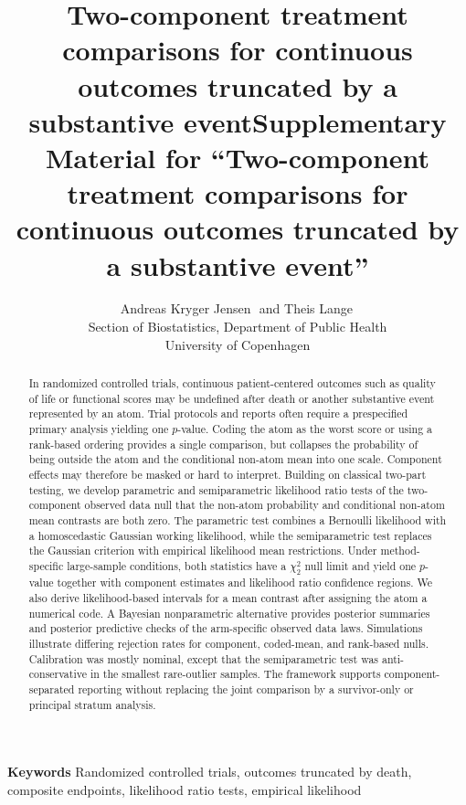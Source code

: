 \documentclass[11pt]{article}
\title{Two-component treatment comparisons for continuous outcomes truncated by a substantive event}
\title{Supplementary Material for ``Two-component treatment comparisons for continuous outcomes truncated by a substantive event''}
\author{
  Andreas Kryger Jensen\,\orcidlink{0000-0002-8233-9176}\, and Theis Lange\,\orcidlink{0000-0001-6807-8347}\\
  Section of Biostatistics, Department of Public Health\\
  University of Copenhagen
}
\date{}
\begin{document}
\maketitle
\begingroup
\renewcommand{\thefootnote}{}
\endgroup

\ifManuscriptIncludeMainText
\begin{abstract}
In randomized controlled trials, continuous patient-centered outcomes such as quality of life or functional scores may be undefined after death or another substantive event represented by an atom. Trial protocols and reports often require a prespecified primary analysis yielding one $p$-value. Coding the atom as the worst score or using a rank-based ordering provides a single comparison, but collapses the probability of being outside the atom and the conditional non-atom mean into one scale. Component effects may therefore be masked or hard to interpret. Building on classical two-part testing, we develop parametric and semiparametric likelihood ratio tests of the two-component observed data null that the non-atom probability and conditional non-atom mean contrasts are both zero. The parametric test combines a Bernoulli likelihood with a homoscedastic Gaussian working likelihood, while the semiparametric test replaces the Gaussian criterion with empirical likelihood mean restrictions. Under method-specific large-sample conditions, both statistics have a $\chi^2_2$ null limit and yield one $p$-value together with component estimates and likelihood ratio confidence regions. We also derive likelihood-based intervals for a mean contrast after assigning the atom a numerical code. A Bayesian nonparametric alternative provides posterior summaries and posterior predictive checks of the arm-specific observed data laws. Simulations illustrate differing rejection rates for component, coded-mean, and rank-based nulls. Calibration was mostly nominal, except that the semiparametric test was anti-conservative in the smallest rare-outlier samples. The framework supports component-separated reporting without replacing the joint comparison by a survivor-only or principal stratum analysis.
\end{abstract}

\begin{center}
\textbf{Keywords} Randomized controlled trials, outcomes truncated by death,\\composite endpoints, likelihood ratio tests, empirical likelihood
\end{center}
\end{document}
